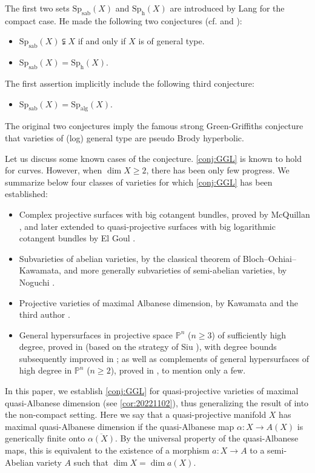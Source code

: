 \documentclass[11pt,english]{smfart}
\theoremstyle{plain}
\theoremstyle{definition}
\theoremstyle{remark}
\numberwithin{equation}{section}
\theoremstyle{plain}
\newcommand{\bP}{\mathbb{P}}
\newcommand{\Spab}{\mathrm{Sp}_{\mathrm{sab}}}
\newcommand{\Sph}{\mathrm{Sp}_{\mathrm{h}}}
\newcommand{\Spalg}{\mathrm{Sp}_{\mathrm{alg}}}
\begin{document}
The first two sets $\Spab(X)$ and $\Sph(X)$ are introduced by Lang for the compact case.
He made the following two conjectures (cf. \cite[I, 3.5]{Lan97} and \cite[VIII, Conjecture 1.3]{Lan97}):
\begin{itemize}
	\item
	$\Spab(X)\subsetneqq X$ if and only if $X$ is of general type.
	\item
	$\Spab(X)=\Sph(X)$.
\end{itemize}
The first assertion implicitly include the following third conjecture:
\begin{itemize}
	\item
	$\Spab(X)=\Spalg(X)$.
\end{itemize}  
The original two conjectures imply the famous strong Green-Griffiths conjecture that varieties of (log) general type are pseudo Brody hyperbolic.  

Let us discuss some known cases of the conjecture.
\cref{conj:GGL} is known to hold for curves. However, when $\dim X \geq 2$, there has been only few progress. We summarize below four classes of varieties for which \cref{conj:GGL} has been established:

\begin{itemize}
	\item Complex projective surfaces with big cotangent bundles, proved by McQuillan \cite{McQ}, and later extended to quasi-projective surfaces with big logarithmic cotangent bundles by El Goul \cite{ElG}.
	\item Subvarieties of abelian varieties, by the classical theorem of Bloch–Ochiai–Kawamata, and more generally subvarieties of semi-abelian varieties, by Noguchi \cite{Nog81}.
	\item Projective varieties of maximal Albanese dimension, by Kawamata \cite{Kaw81} and the third author \cite{Yam15}.
	\item General hypersurfaces in projective space $\bP^n$ ($n \geq 3$) of sufficiently high degree, proved in \cite{DMR} (based on the strategy of Siu \cite{Siu02}), with degree bounds subsequently improved in \cite{Dar16,MT,BK24,Cad24}; as well as complements of general hypersurfaces of high degree in $\bP^n$ ($n \geq 2$), proved in \cite{Dar16,BD19}, to mention only a few.
\end{itemize}



In this paper, we establish \cref{conj:GGL} for quasi-projective varieties of maximal quasi-Albanese dimension 
(see \cref{cor:20221102}), thus generalizing the result of \cite{Yam15} into the non-compact setting.
Here we say that a quasi-projective manifold $X$ has maximal quasi-Albanese dimension if the quasi-Albanese map $\alpha:X\to A(X)$ is generically finite onto $\overline{\alpha(X)}$.
By the universal property of the quasi-Albanese maps, this is equivalent to the existence of a morphism $a:X\to A$ to a semi-Abelian variety $A$ such that $\dim X=\dim a(X)$.
\end{document}
